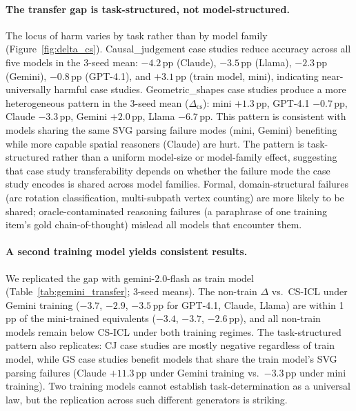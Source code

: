 \documentclass{article}
\begin{document}
\paragraph{The transfer gap is task-structured, not model-structured.}
The locus of harm varies by task rather than by model family (Figure~\ref{fig:delta_cs}).
Causal\_judgement case studies reduce accuracy across all five models in the 3-seed mean:
$-4.2$\,pp (Claude), $-3.5$\,pp (Llama), $-2.3$\,pp (Gemini), $-0.8$\,pp (GPT-4.1),
and $+3.1$\,pp (train model, mini), indicating near-universally harmful case studies.
Geometric\_shapes case studies produce a more heterogeneous pattern in the 3-seed mean
($\Delta_\text{cs}$): mini $+1.3$\,pp, GPT-4.1 $-0.7$\,pp, Claude $-3.3$\,pp, Gemini $+2.0$\,pp,
Llama $-6.7$\,pp. This pattern is consistent with models sharing the same SVG parsing failure modes
(mini, Gemini) benefiting while more capable spatial reasoners (Claude) are hurt.
The pattern is task-structured rather than a uniform model-size or model-family effect,
suggesting that case study transferability depends on whether the failure mode the case study
encodes is shared across model families.
Formal, domain-structural failures (arc rotation classification, multi-subpath vertex counting)
are more likely to be shared; oracle-contaminated reasoning failures (a paraphrase of one
training item's gold chain-of-thought) mislead all models that encounter them.

\paragraph{A second training model yields consistent results.}
We replicated the gap with gemini-2.0-flash as train model (Table~\ref{tab:gemini_transfer};
3-seed means).
The non-train $\Delta$ vs.\ CS-ICL under Gemini training ($-3.7$, $-2.9$, $-3.5$\,pp for
GPT-4.1, Claude, Llama) are within 1\,pp of the mini-trained equivalents ($-3.4$, $-3.7$,
$-2.6$\,pp), and all non-train models remain below CS-ICL under both training regimes.
The task-structured pattern also replicates: CJ case studies are mostly negative regardless
of train model, while GS case studies benefit models that share the train model's SVG parsing
failures (Claude $+11.3$\,pp under Gemini training vs.\ $-3.3$\,pp under mini training).
Two training models cannot establish task-determination as a universal law, but the replication
across such different generators is striking.
\end{document}

